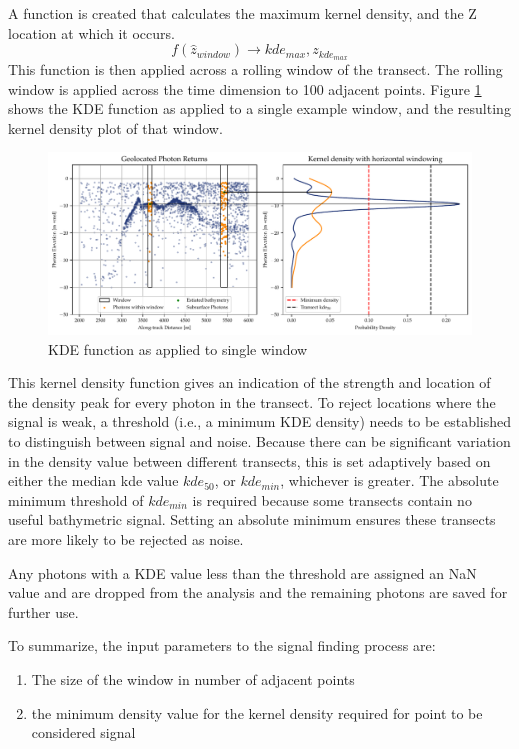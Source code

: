 A function is created that calculates the maximum kernel density, and the Z location at which it occurs. $$ f(\hat{z}_{window}) \rightarrow kde_{max},z_{kde_{max}} $$ This function is then applied across a rolling window of the transect. The rolling window is applied across the time dimension to 100 adjacent points. Figure \ref{fig:kdefunc} shows the KDE function as applied to a single example window, and the resulting kernel density plot of that window.

\begin{figure}[htbp]
    \centering
    \includegraphics[width=\textwidth]{figures/2d_kde_plot.pdf}
    \caption{KDE function as applied to single window}
    \label{fig:kdefunc}
\end{figure}

This kernel density function gives an indication of the strength and location of the density peak for every photon in the transect. To reject locations where the signal is weak, a threshold (i.e., a minimum KDE density) needs to be established to distinguish between signal and noise. Because there can be significant variation in the density value between different transects, this is set adaptively based on either the median kde value $kde_{50}$, or $kde_{min}$, whichever is greater. The absolute minimum threshold of $kde_{min}$ is required because some transects contain no useful bathymetric signal. Setting an absolute minimum ensures these transects are more likely to be rejected as noise. 

Any photons with a KDE value less than the threshold are assigned an NaN value and are dropped from the analysis and the remaining photons are saved for further use.

To summarize, the input parameters to the signal finding process are:

\begin{enumerate}
    \item The size of the window in number of adjacent points
    \item the minimum density value for the kernel density required for point to be considered signal
\end{enumerate}

